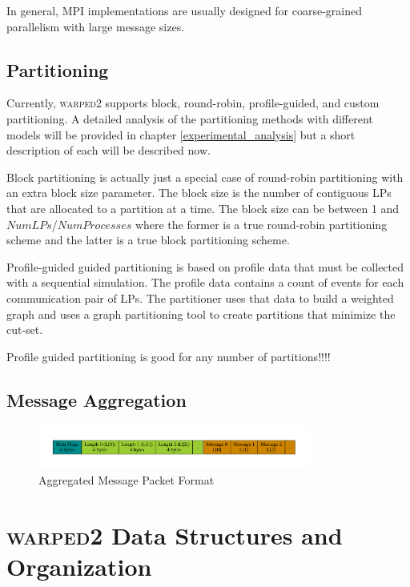 \documentclass[11pt]{book}
\begin{document}
In general, MPI implementations are usually designed for coarse-grained parallelism with large
message sizes.

\section{Partitioning}

Currently, \textsc{warped2} supports block, round-robin, profile-guided, and custom partitioning.
A detailed analysis of the partitioning methods with different models will be provided in
chapter \ref{experimental_analysis} but a short description of each will be described now. 

Block partitioning is actually just a special case of round-robin partitioning with an extra
block size parameter. The block size is the number of contiguous LPs that are allocated to a
partition at a time. The block size can be between 1 and $NumLPs$/$NumProcesses$ where the
former is a true round-robin partitioning scheme and the latter is a true block partitioning
scheme.

Profile-guided guided partitioning is based on profile data that must be collected with a
sequential simulation. The profile data contains a count of events for each communication pair
of LPs. The partitioner uses that data to build a weighted graph and uses a graph partitioning
tool to create partitions that minimize the cut-set.

Profile guided partitioning is good for any number of partitions!!!!

\section{Message Aggregation}

\begin{figure}
    \centering
    \includegraphics[width=0.8\textwidth,quiet]{figs/graphviz/aggregation_format.pdf}
    \caption{Aggregated Message Packet Format}
\end{figure}


\chapter{\textsc{warped2} Data Structures and Organization}\label{warped2_ds}
\end{document}
